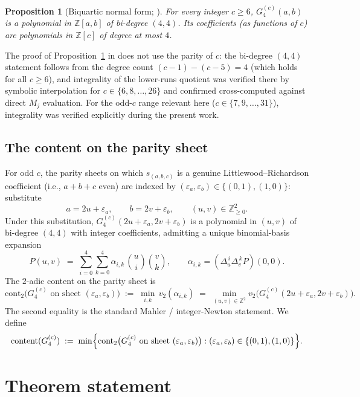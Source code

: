 \documentclass[11pt]{article}
\newtheorem{proposition}[theorem]{Proposition}
\begin{document}
\begin{proposition}[Biquartic normal form; \cite{clio2026capidentity}]
\label{prop:biquartic}
For every integer $c \ge 6$, $G_4^{(c)}(a,b)$ is a polynomial in
$\mathbb{Z}[a,b]$ of bi-degree $(4,4)$. Its coefficients (as functions of $c$)
are polynomials in $\mathbb{Z}[c]$ of degree at most $4$.
\end{proposition}

The proof of Proposition~\ref{prop:biquartic} in \cite{clio2026capidentity}
does not use the parity of $c$: the bi-degree $(4,4)$ statement follows from
the degree count $(c-1) - (c-5) = 4$ (which holds for all $c \ge 6$), and
integrality of the lower-runs quotient was verified there by symbolic
interpolation for $c \in \{6, 8, \ldots, 26\}$ and confirmed cross-computed
against direct $M_j$ evaluation. For the odd-$c$ range relevant here
($c \in \{7, 9, \ldots, 31\}$), integrality was verified explicitly during the
present work.

\subsection{The content on the parity sheet}\label{ssec:content}

For odd $c$, the parity sheets on which $s_{(a,b,c)}$ is a genuine
Littlewood--Richardson coefficient (i.e., $a + b + c$ even) are indexed by
$(\varepsilon_a, \varepsilon_b) \in \{(0,1), (1,0)\}$: substitute
\[
  a = 2u + \varepsilon_a, \qquad b = 2v + \varepsilon_b, \qquad (u,v) \in \mathbb{Z}_{\ge 0}^2.
\]
Under this substitution, $G_4^{(c)}(2u+\varepsilon_a, 2v+\varepsilon_b)$ is a
polynomial in $(u,v)$ of bi-degree $(4,4)$ with integer coefficients, admitting
a unique binomial-basis expansion
\[
  P(u,v) \;=\; \sum_{i=0}^{4}\sum_{k=0}^{4} \alpha_{i,k}\,\binom{u}{i}\binom{v}{k},
  \qquad \alpha_{i,k} = (\Delta_u^{\,i} \Delta_v^{\,k} P)(0,0).
\]
The $2$-adic content on the parity sheet is
\[
  \mathrm{cont}_2\bigl(G_4^{(c)} \text{ on sheet }(\varepsilon_a, \varepsilon_b)\bigr)
    \;:=\; \min_{i,k}\, v_2(\alpha_{i,k})
    \;=\; \min_{(u,v)\in\mathbb{Z}^2} v_2\bigl(G_4^{(c)}(2u+\varepsilon_a, 2v+\varepsilon_b)\bigr).
\]
The second equality is the standard Mahler / integer-Newton statement. We
define
\[
  \mathrm{content}(G_4^{(c)}) \;:=\; \min\Bigl\{\mathrm{cont}_2 \bigl(G_4^{(c)} \text{ on sheet } (\varepsilon_a, \varepsilon_b)\bigr) : (\varepsilon_a, \varepsilon_b) \in \{(0,1),(1,0)\}\Bigr\}.
\]

\section{Theorem statement}
\end{document}
